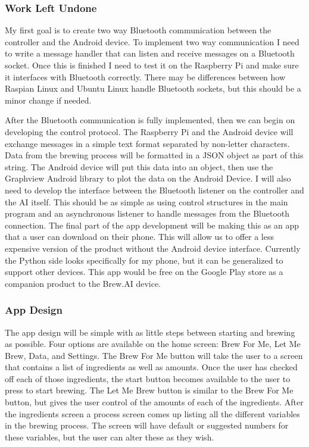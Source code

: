 \documentclass[draftclsnofoot,onecolumn,letterpaper,10pt]{IEEEtran}
\begin{document}
\subsubsection{Work Left Undone}
My first goal is to create two way Bluetooth communication between the controller and the Android device.
To implement two way communication I need to write a message handler that can listen and receive messages on a Bluetooth socket.
Once this is finished I need to test it on the Raspberry Pi and make sure it interfaces with Bluetooth correctly.
There may be differences between how Raspian Linux and Ubuntu Linux handle Bluetooth sockets, but this should be
a minor change if needed.


After the Bluetooth communication is fully implemented, then we can begin on developing the control protocol.
The Raspberry Pi and the Android device will exchange messages in a simple text format separated by non-letter characters.
Data from the brewing process will be formatted in a JSON object as part of this string.
The Android device will put this data into an object, then use the Graphview Android library to plot the data on the Android Device.
I will also need to develop the interface between the Bluetooth listener on the controller and the AI itself.
This should be as simple as using control structures in the main program and an asynchronous listener to handle messages from the Bluetooth connection.
The final part of the app development will be making this as an app that a user can download on their phone.
This will allow us to offer a less expensive version of the product without the Android device interface.
Currently the Python side looks specifically for my phone, but it can be generalized to support other devices.
This app would be free on the Google Play store as a companion product to the Brew.AI device.

\subsubsection{App Design}
The app design will be simple with as little steps between starting and brewing as possible.
Four options are available on the home screen: Brew For Me, Let Me Brew, Data, and Settings.
The Brew For Me button will take the user to a screen that contains a list of ingredients as well as amounts.
Once the user has checked off each of those ingredients, the start button becomes available to the user to press to start brewing.
The Let Me Brew button is similar to the Brew For Me button, but gives the user control of the amounts of each of the ingredients.
After the ingredients screen a process screen comes up listing all the different variables in the brewing process.
The screen will have default or suggested numbers for these variables, but the user can alter these as they wish.
\end{document}
